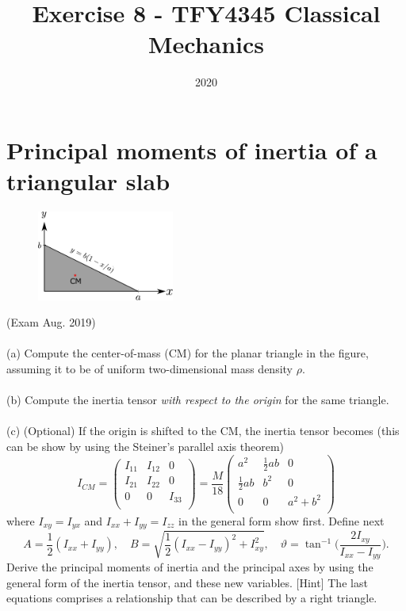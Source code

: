 \documentclass{article}
\title{Exercise 8 - TFY4345 Classical Mechanics}
\date{2020}
\begin{document}
    \maketitle
    \section{Principal moments of inertia of a triangular slab}
        \begin{figure}
            \includegraphics[width=0.4\textwidth]{figures/exercise_1_triangle.pdf}
        \end{figure}
        (Exam Aug. 2019) 
        \\ \\
        (a) Compute the center-of-mass (CM) for the planar triangle in the figure, assuming it to be of uniform two-dimensional mass density $\rho$.
        \\ \\
        (b) Compute the inertia tensor \emph{with respect to the origin} for the same triangle.
        \\ \\
        (c) (Optional) If the origin is shifted to the CM, the inertia tensor becomes (this can be show by using the Steiner's parallel axis theorem)
        \begin{equation*}
            I_{CM} = 
            \begin{pmatrix*}
                I_{11} & I_{12} & 0 \\
                I_{21} & I_{22} & 0 \\
                0 & 0 & I_{33} \\
            \end{pmatrix*}
             =\frac{M}{18} 
            \begin{pmatrix*}
                a^2 & \frac{1}{2}ab & 0 \\
                \frac{1}{2}ab & b^2 & 0 \\
                0 & 0 & a^2 + b^2 \\
            \end{pmatrix*}
        \end{equation*}
        where $I_{xy} = I_{yx}$ and $I_{xx} + I_{yy} = I_{zz}$ in the general form show first. Define next
        \begin{equation*}
            A = \frac{1}{2}(I_{xx} + I_{yy}), \quad B = \sqrt{\frac{1}{2}(I_{xx} - I_{yy})^2 + I_{xy}^2}, \quad \vartheta = \tan^{-1}\bigg( \frac{2I_{xy}}{I_{xx} - I_{yy}}\bigg).
        \end{equation*}
        Derive the principal moments of inertia and the principal axes by using the general form of the inertia tensor, and these new variables. [Hint] The last equations comprises a relationship that can be described by a right triangle.
\end{document}
